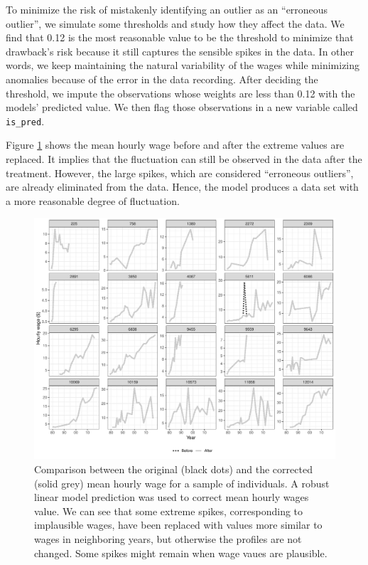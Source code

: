 \documentclass{article}
\begin{document}
To minimize the risk of mistakenly identifying an outlier as an ``erroneous outlier'', we simulate some thresholds and study how they affect the data. We find that 0.12 is the most reasonable value to be the threshold to minimize that drawback's risk because it still captures the sensible spikes in the data. In other words, we keep maintaining the natural variability of the wages while minimizing anomalies because of the error in the data recording. After deciding the threshold, we impute the observations whose weights are less than 0.12 with the models' predicted value. We then flag those observations in a new variable called \texttt{is\_pred}.

Figure \ref{fig:compare-plot} shows the mean hourly wage before and after the extreme values are replaced. It implies that the fluctuation can still be observed in the data after the treatment. However, the large spikes, which are considered ``erroneous outliers'', are already eliminated from the data. Hence, the model produces a data set with a more reasonable degree of fluctuation.

\begin{figure}

{\centering \includegraphics[width=0.9\linewidth]{figures/compare-plot-1} 

}

\caption{Comparison between the original (black dots) and the corrected (solid grey) mean hourly wage for a sample of individuals. A robust linear model prediction was used to correct mean hourly wages value. We can see that some extreme spikes, corresponding to implausible wages, have been replaced with values more similar to wages in neighboring years, but otherwise the profiles are not changed. Some spikes might remain when wage vaues are plausible.}\label{fig:compare-plot}
\end{figure}
\end{document}
